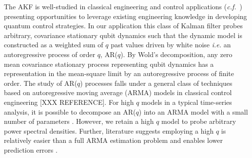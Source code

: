 The AKF is well-studied in classical engineering and control applications (\emph{c.f.}~\cite{moon2006real}) presenting opportunities to leverage existing engineering knowledge in developing quantum control strategies.  In our application this class of Kalman filter probes arbitrary, covariance stationary qubit dynamics such that the dynamic model is constructed as a weighted sum of $q$ past values driven by white noise {\em i.e.} an autoregressive process of order $q$, AR($q$). By Wold's decomposition, any zero mean covariance stationary process representing qubit dynamics has a representation in the mean-square limit by an autoregressive process of finite order.%
The study of AR($q$) processes falls under a general class of techniques based on autoregressive moving average (ARMA) models in classical control engineering [XXX REFERENCE]. For high $q$ models in a typical time-series analysis, it is possible to decompose an AR($q$) into an ARMA model with a small number of parameters \cite{brockwell1996introduction, salzmann1991detection}. However, we retain a high $q$ model to probe arbitrary power spectral densities. Further, literature suggests employing a high $q$ is relatively easier than a full ARMA estimation problem and enables lower prediction errors \cite{wahlberg1989estimation,brockwell1996introduction}.

